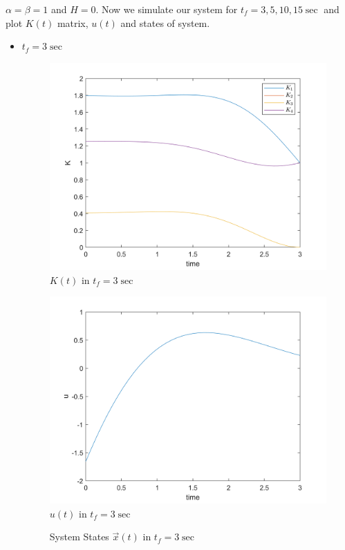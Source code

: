 $\alpha = \beta = 1$ and $H = 0$.
Now we simulate our system for $t_f = 3, 5, 10, 15\sec$ and plot $K(t)$ matrix, $u(t)$ and states of system.

\begin{itemize}
	\item $t_f = 3\sec$
	\begin{figure}[H]
		\caption{$K(t)$ in $t_f = 3\sec$}
		\centering
		\includegraphics[width=12cm]{../Code/Q3/figures/K3.png}
	\end{figure}
\begin{figure}[H]
	\caption{$u(t)$ in $t_f = 3\sec$}
	\centering
	\includegraphics[width=12cm]{../Code/Q3/figures/u3.png}
\end{figure}
\begin{figure}[H]
	\caption{System States $\vec x(t)$ in $t_f = 3\sec$}
	\centering

\end{figure}
\end{itemize}

